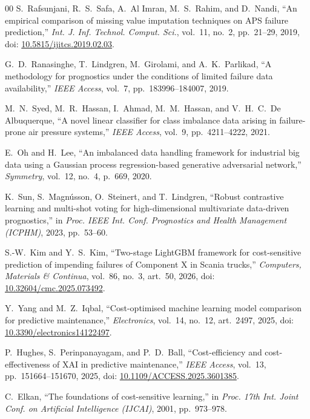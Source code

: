 \documentclass[conference]{IEEEtran}
\begin{document}
\begin{thebibliography}{00}
S.~Rafsunjani, R.~S.~Safa, A.~Al Imran, M.~S.~Rahim, and D.~Nandi, ``An empirical comparison of missing value imputation techniques on APS failure prediction,'' \emph{Int. J. Inf. Technol. Comput. Sci.}, vol.~11, no.~2, pp.~21--29, 2019, doi: \href{https://doi.org/10.5815/ijitcs.2019.02.03}{10.5815/ijitcs.2019.02.03}.

G.~D.~Ranasinghe, T.~Lindgren, M.~Girolami, and A.~K.~Parlikad, ``A methodology for prognostics under the conditions of limited failure data availability,'' \emph{IEEE Access}, vol.~7, pp.~183996--184007, 2019.

M.~N.~Syed, M.~R.~Hassan, I.~Ahmad, M.~M.~Hassan, and V.~H.~C.~De Albuquerque, ``A novel linear classifier for class imbalance data arising in failure-prone air pressure systems,'' \emph{IEEE Access}, vol.~9, pp.~4211--4222, 2021.

E.~Oh and H.~Lee, ``An imbalanced data handling framework for industrial big data using a Gaussian process regression-based generative adversarial network,'' \emph{Symmetry}, vol.~12, no.~4, p.~669, 2020.

K.~Sun, S.~Magn\'usson, O.~Steinert, and T.~Lindgren, ``Robust contrastive learning and multi-shot voting for high-dimensional multivariate data-driven prognostics,'' in \emph{Proc. IEEE Int. Conf. Prognostics and Health Management (ICPHM)}, 2023, pp.~53--60.

S.-W.~Kim and Y.~S.~Kim, ``Two-stage LightGBM framework for cost-sensitive prediction of impending failures of Component X in Scania trucks,'' \emph{Computers, Materials \& Continua}, vol.~86, no.~3, art.~50, 2026, doi: \href{https://doi.org/10.32604/cmc.2025.073492}{10.32604/cmc.2025.073492}.

Y.~Yang and M.~Z.~Iqbal, ``Cost-optimised machine learning model comparison for predictive maintenance,'' \emph{Electronics}, vol.~14, no.~12, art.~2497, 2025, doi: \href{https://doi.org/10.3390/electronics14122497}{10.3390/electronics14122497}.

P.~Hughes, S.~Perinpanayagam, and P.~D.~Ball, ``Cost-efficiency and cost-effectiveness of XAI in predictive maintenance,'' \emph{IEEE Access}, vol.~13, pp.~151664--151670, 2025, doi: \href{https://doi.org/10.1109/ACCESS.2025.3601385}{10.1109/ACCESS.2025.3601385}.

C.~Elkan, ``The foundations of cost-sensitive learning,'' in \emph{Proc. 17th Int. Joint Conf. on Artificial Intelligence (IJCAI)}, 2001, pp.~973--978.


\end{thebibliography}
\end{document}
